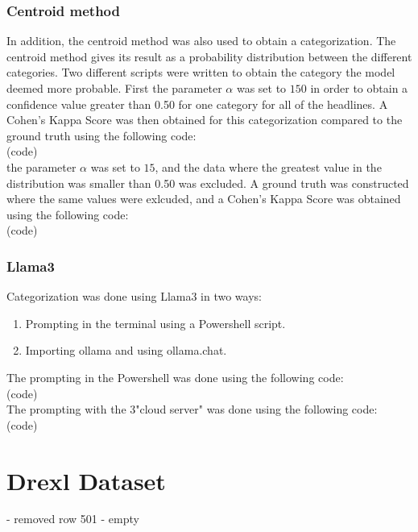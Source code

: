 \begin{flushleft}
\subsubsection{Centroid method}

In addition, the centroid method was also used to obtain a categorization. 
The centroid method gives its result as a probability distribution between the different categories. 
Two different scripts were written to obtain the category the model deemed more probable.
First the parameter $\alpha$ was set to $150$ in order to obtain a confidence value greater than 0.50 for one category for all of the headlines. 
A Cohen's Kappa Score was then obtained for this categorization compared to the ground truth using the following code:\\
(code)\\
the parameter $\alpha$ was set to $15$, and the data where the greatest value in the distribution was smaller than 0.50 was excluded. 
A ground truth was constructed where the same values were exlcuded, 
and a Cohen's Kappa Score was obtained using the following code:\\
(code)\\

\subsubsection{Llama3}
Categorization was done using Llama3 in two ways: 
\begin{enumerate}
\item Prompting in the terminal using a Powershell script.
\item Importing ollama and using ollama.chat.
\end{enumerate}

The prompting in the Powershell was done using the following code:\\
(code)\\

The prompting with the 3"cloud server" was done using the following code:\\
(code)\\

\section{Drexl Dataset}
- removed row 501 - empty

\end{flushleft}
